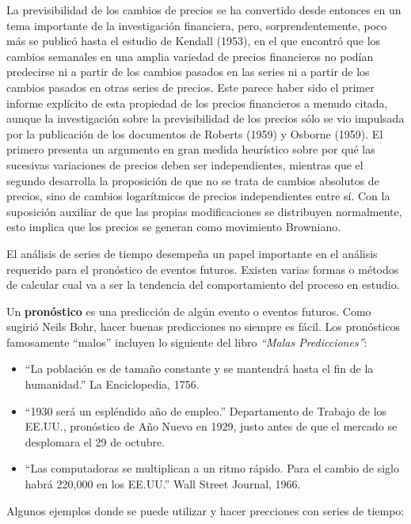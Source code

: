 \documentclass[12pt,]{krantz}
\theoremstyle{definition}
\theoremstyle{definition}
\theoremstyle{definition}
\theoremstyle{remark}
\begin{document}
La previsibilidad de los cambios de precios se ha convertido desde
entonces en un tema importante de la investigación financiera, pero,
sorprendentemente, poco más se publicó hasta el estudio de Kendall
(1953), en el que encontró que los cambios semanales en una amplia
variedad de precios financieros no podían predecirse ni a partir de los
cambios pasados en las series ni a partir de los cambios pasados en
otras series de precios. Este parece haber sido el primer informe
explícito de esta propiedad de los precios financieros a menudo citada,
aunque la investigación sobre la previsibilidad de los precios sólo se
vio impulsada por la publicación de los documentos de Roberts (1959) y
Osborne (1959). El primero presenta un argumento en gran medida
heurístico sobre por qué las sucesivas variaciones de precios deben ser
independientes, mientras que el segundo desarrolla la proposición de que
no se trata de cambios absolutos de precios, sino de cambios
logarítmicos de precios independientes entre sí. Con la suposición
auxiliar de que las propias modificaciones se distribuyen normalmente,
esto implica que los precios se generan como movimiento Browniano.

El análisis de series de tiempo desempeña un papel importante en el
análisis requerido para el pronóstico de eventos futuros. Existen varias
formas o métodos de calcular cual va a ser la tendencia del
comportamiento del proceso en estudio.

Un \textbf{pronóstico} es una predicción de algún evento o eventos
futuros. Como sugirió Neils Bohr, hacer buenas predicciones no siempre
es fácil. Los pronósticos famosamente ``malos'' incluyen lo siguiente
del libro \emph{``Malas Predicciones''}:

\begin{itemize}
\item
  ``La población es de tamaño constante y se mantendrá hasta el fin de
  la humanidad.'' La Enciclopedia, 1756.
\item
  ``1930 será un espléndido año de empleo.'' Departamento de Trabajo de
  los EE.UU., pronóstico de Año Nuevo en 1929, justo antes de que el
  mercado se desplomara el 29 de octubre.
\item
  ``Las computadoras se multiplican a un ritmo rápido. Para el cambio de
  siglo habrá 220,000 en los EE.UU.'' Wall Street Journal, 1966.
\end{itemize}

Algunos ejemplos donde se puede utilizar y hacer precciones con series
de tiempo:
\end{document}
